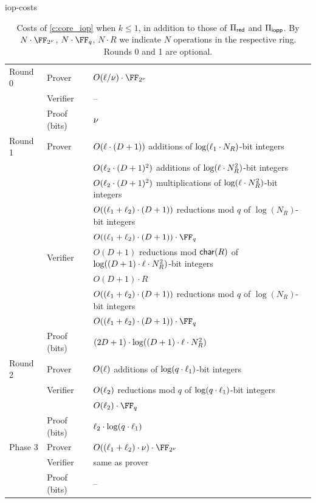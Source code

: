 \begin{lncsappendix}{iop-costs}
\begin{table}[H]
  \centering
  \begin{tabular}{l|l|l}
    \toprule
    Round 0 & Prover & $O(\codedim/\comfieldexp)\cdot \comfield$ \\
     & Verifier & -- \\
     & Proof (bits) & $\nu$ \\
    \hline
    Round 1 & Prover & $O(\ell\cdot (D+1))$ additions of $\log(\ell_1 \cdot N_R)$-bit integers \\
     & & $O(\ell_2\cdot (D+1)^2)$ additions of $\log(\ell \cdot N_R^2)$-bit integers \\
     & & $O(\ell_2\cdot (D+1)^2)$ multiplications of $\log(\ell\cdot N_R^2)$-bit integers \\
     & & $O((\ell_1+\ell_2)\cdot (D+1))$ reductions mod $q$ of $\log(N_R)$-bit integers \\
     & & $O((\codedim_1+\codedim_2)\cdot (D+1))\cdot \FF_q$ \\
     & Verifier & $O(D+1)$ reductions mod $\mathsf{char}(R)$ of $\log((D+1)\cdot \ell\cdot N_R^2)$-bit integers \\
     &  & $O(D+1)\cdot R$ \\
     & & $O((\ell_1+\ell_2)\cdot (D+1))$ reductions mod $q$ of $\log(N_R)$-bit integers \\
     & & $O((\codedim_1+\codedim_2)\cdot (D+1))\cdot \FF_q$ \\
     & Proof (bits) & $(2 D + 1)\cdot \log((D+1)\cdot \ell\cdot N_R^2)$ \\
    \hline
    Round 2 & Prover & $O(\ell)$ additions of $\log(q\cdot \ell_1)$-bit integers \\
     & Verifier & $O(\ell_2)$ reductions mod $q$ of $\log(q\cdot \ell_1)$-bit integers \\
     & & $O(\codedim_2)\cdot \FF_q$ \\
     & Proof (bits) & $\ell_2\cdot \log(q\cdot \ell_1)$ \\
    \hline
    Phase 3 & Prover & $O((\codedim_1+\codedim_2)\cdot \comfieldexp)\cdot \comfield$ \\
     & Verifier & same as prover \\
     & Proof (bits) & -- \\
    \bottomrule
  \end{tabular}
  \caption{Costs of \cref{c:core_iop} when $k\leq 1$, in addition to those of $\Pi_{\mathsf{red}}$ and $\Pi_{\mathsf{iopp}}$. By $N\cdot \comfield$, $N\cdot \FF_q$, $N\cdot R$ we indicate $N$ operations in the respective ring. Rounds 0 and 1 are optional.}
  \label{t:core_iop_complexity}
\end{table}


\end{lncsappendix}
